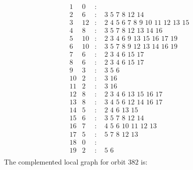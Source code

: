 \documentclass[12pt]{article}
\begin{document}
\begin{equation*}
\begin{array}{rrcl}
1&0&:&\\
2&6&:&\,\,3\,\,5\,\,7\,\,8\,\,12\,\,14\\
3&12&:&\,\,2\,\,4\,\,5\,\,6\,\,7\,\,8\,\,9\,\,10\,\,11\,\,12\,\,13\,\,15\\
4&8&:&\,\,3\,\,5\,\,7\,\,8\,\,12\,\,13\,\,14\,\,16\\
5&10&:&\,\,2\,\,3\,\,4\,\,6\,\,9\,\,13\,\,15\,\,16\,\,17\,\,19\\
6&10&:&\,\,3\,\,5\,\,7\,\,8\,\,9\,\,12\,\,13\,\,14\,\,16\,\,19\\
7&6&:&\,\,2\,\,3\,\,4\,\,6\,\,15\,\,17\\
8&6&:&\,\,2\,\,3\,\,4\,\,6\,\,15\,\,17\\
9&3&:&\,\,3\,\,5\,\,6\\
10&2&:&\,\,3\,\,16\\
11&2&:&\,\,3\,\,16\\
12&8&:&\,\,2\,\,3\,\,4\,\,6\,\,13\,\,15\,\,16\,\,17\\
13&8&:&\,\,3\,\,4\,\,5\,\,6\,\,12\,\,14\,\,16\,\,17\\
14&5&:&\,\,2\,\,4\,\,6\,\,13\,\,15\\
15&6&:&\,\,3\,\,5\,\,7\,\,8\,\,12\,\,14\\
16&7&:&\,\,4\,\,5\,\,6\,\,10\,\,11\,\,12\,\,13\\
17&5&:&\,\,5\,\,7\,\,8\,\,12\,\,13\\
18&0&:&\\
19&2&:&\,\,5\,\,6\\
\end{array}
\end{equation*}
The complemented local graph for orbit $382$ is:
\end{document}
